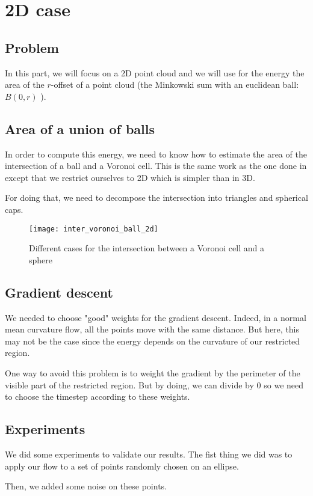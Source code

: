 \chapter{2D case}

\section{Problem}
In this part, we will focus on a 2D point cloud and we will use for the energy
the area of the $r$-offset of a point cloud (the Minkowski sum with an euclidean
ball: $B(0, r)$ ).

\section{Area of a union of balls}
In order to compute this energy, we need to know how to estimate the area of the
intersection of a ball and a Voronoi cell.
This is the same work as the one done in \cite{cazals2011computing} except that
we restrict ourselves to 2D which is simpler than in 3D.

For doing that, we need to decompose the intersection into triangles and
spherical caps.

\begin{figure}[H]
   \centering
   \texttt{[image: inter\_voronoi\_ball\_2d]}
   \caption{Different cases for the intersection between a Voronoi cell and a sphere}
   \label{fig:inter_voronoi_ball_2d}
\end{figure}

\section{Gradient descent}
We needed to choose "good" weights for the gradient descent. Indeed, in a normal
mean curvature flow, all the points move with the same distance. But here, this
may not be the case since the energy depends on the curvature of our restricted
region.

One way to avoid this problem is to weight the gradient by the perimeter of the
visible part of the restricted region. But by doing, we can divide by $0$ so we
need to choose the timestep according to these weights.

\section{Experiments}
We did some experiments to validate our results. The fist thing we did was to
apply our flow to a set of points randomly chosen on an ellipse.

Then, we added some noise on these points.


